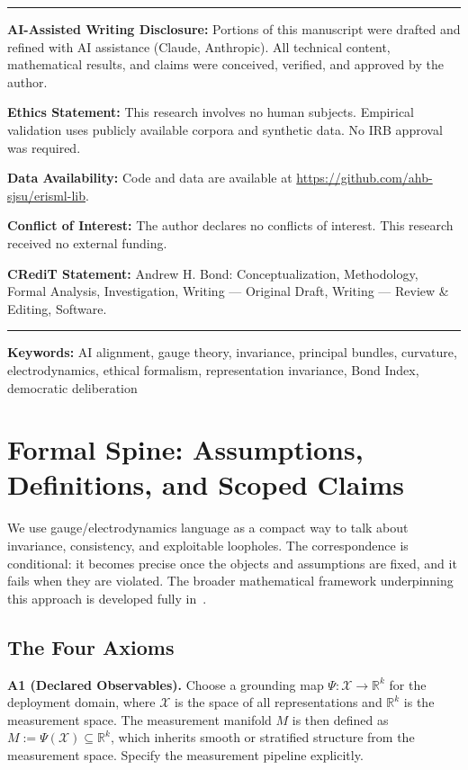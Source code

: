 \documentclass[12pt]{article}
\begin{document}
\begin{titlepage}
\vfill

\noindent\rule{\linewidth}{0.4pt}
\small
\noindent\textbf{AI-Assisted Writing Disclosure:} Portions of this manuscript were drafted and refined with AI assistance (Claude, Anthropic). All technical content, mathematical results, and claims were conceived, verified, and approved by the author.

\noindent\textbf{Ethics Statement:} This research involves no human subjects. Empirical validation uses publicly available corpora and synthetic data. No IRB approval was required.

\noindent\textbf{Data Availability:} Code and data are available at \url{https://github.com/ahb-sjsu/erisml-lib}.

\noindent\textbf{Conflict of Interest:} The author declares no conflicts of interest. This research received no external funding.

\noindent\textbf{CRediT Statement:} Andrew H. Bond: Conceptualization, Methodology, Formal Analysis, Investigation, Writing --- Original Draft, Writing --- Review \& Editing, Software.
\noindent\rule{\linewidth}{0.4pt}
\normalsize

\end{titlepage}

\noindent\textbf{Keywords:} AI alignment, gauge theory, invariance, principal bundles, curvature, electrodynamics, ethical formalism, representation invariance, Bond Index, democratic deliberation

\section{Formal Spine: Assumptions, Definitions, and Scoped Claims}

We use gauge/electrodynamics language as a compact way to talk about invariance, consistency,
and exploitable loopholes. The correspondence is conditional: it becomes precise once the objects
and assumptions are fixed, and it fails when they are violated. The broader mathematical framework underpinning this approach is developed fully in~\cite{bond2026ge}.

\subsection{The Four Axioms}

\textbf{A1 (Declared Observables).} Choose a grounding map $\Psi : \mathcal{X} \to \mathbb{R}^k$ for the deployment domain,
where $\mathcal{X}$ is the space of all representations and $\mathbb{R}^k$ is the measurement space. The measurement
manifold $M$ is then defined as $M := \Psi(\mathcal{X}) \subseteq \mathbb{R}^k$, which inherits smooth or stratified structure from
the measurement space. Specify the measurement pipeline explicitly.
\end{document}
